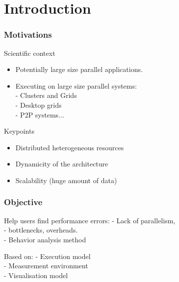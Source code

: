 \section{Introduction}

\frame
{
  \frametitle{Motivations}
\begin{block}{Scientific context}
\begin{itemize}
\item Potentially large size parallel applications.
\item Executing on large size parallel systems:\\
- Clusters and Grids \\
- Desktop grids\\
- P2P systems...
\end{itemize}
\end{block}
\begin{block}{Keypoints}
\begin{itemize}
\item Distributed heterogeneous resources
\item Dynamicity of the architecture
\item Scalability (huge amount of data)
\end{itemize}
\end{block}
}
\begin{frame}
\frametitle{Objective}
\begin{block}{Help users find performance errors:}
- Lack of parallelism, \\
- bottlenecks, overheads.\\
- Behavior analysis method
\end{block}
\begin{block}{Based on:}
- Execution model\\
- Measurement environment\\
- Visualisation model
\end{block}
\end{frame}

